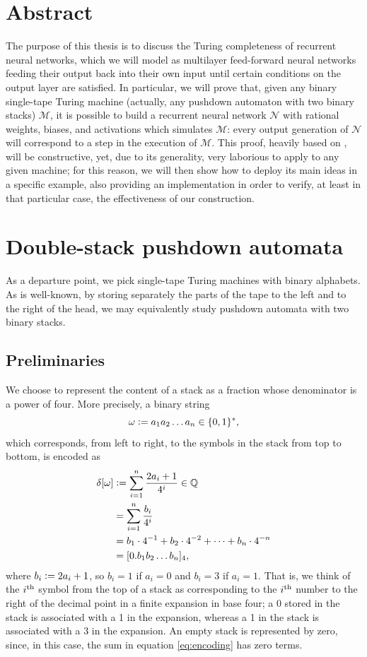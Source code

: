\documentclass{book}
\newcommand{\defeq}{\vcentcolon=}
\newcommand{\Q}{\mathbb{Q}}
\theoremstyle{definition}
\theoremstyle{plain}
\theoremstyle{plain}
\theoremstyle{remark}
\theoremstyle{plain}
\begin{document}
	\chapter*{Abstract}
	The purpose of this thesis is to discuss the Turing completeness of recurrent neural networks, which we will model as multilayer feed-forward neural networks feeding their output back into their own input until certain conditions on the output layer are satisfied. In particular, we will prove that, given any binary single-tape Turing machine (actually, any pushdown automaton with two binary stacks) $\mathcal{M}$, it is possible to build a recurrent neural network $\mathcal{N}$ with rational weights, biases, and activations which simulates $\mathcal{M}$: every output generation of $\mathcal{N}$ will correspond to a step in the execution of $\mathcal{M}$. This proof, heavily based on \cite{SiegSon}, will be constructive, yet, due to its generality, very laborious to apply to any given machine; for this reason, we will then show how to deploy its  main ideas in a specific example, also providing an implementation in order to verify, at least in that particular case, the effectiveness of our construction.
	
	\mainmatter
	
	\chapter{Double-stack pushdown automata}
	As a departure point, we pick single-tape Turing machines with binary alphabets. As is well-known, by storing separately the parts of the tape to the left and to the right of the head, we may equivalently study pushdown automata with two binary stacks.
	
	\section{Preliminaries} \label{sec:preliminaries}
	We choose to represent the content of a stack as a fraction whose denominator is a power of four. More precisely, a binary string $$\omega\defeq a_1a_2 \dots a_n \in \{0,1\}^*,$$ which corresponds, from left to right, to the symbols in the stack from top to bottom, is encoded as 
	\begin{align} 
		\delta[\omega] &\defeq \sum_{i=1}^{n} \frac{2a_i+1}{4^i} \in \Q \label{eq:encoding} \\
					   &=      \sum_{i=1}^{n} \frac{b_i}{4^i} \nonumber \\
					   &=      b_1 \cdot 4^{-1} + b_2 \cdot 4^{-2} + \cdots + b_n \cdot 4^{-n} \nonumber \\
					   &=      [0.b_1b_2 \dots b_n]_4, \nonumber
	\end{align}
	where $b_i \defeq 2a_i+1$, so $b_i=1$ if $a_i=0$ and $b_i=3$ if $a_i=1$. That is, we think of the $i\textsuperscript{th}$ symbol from the top of a stack as corresponding to the $i\textsuperscript{th}$ number to the right of the decimal point in a finite expansion in base four; a 0 stored in the stack is associated with a 1 in the expansion, whereas a 1 in the stack is associated with a 3 in the expansion. An empty stack is represented by zero, since, in this case, the sum in equation \ref{eq:encoding} has zero terms.
	
\end{document}
